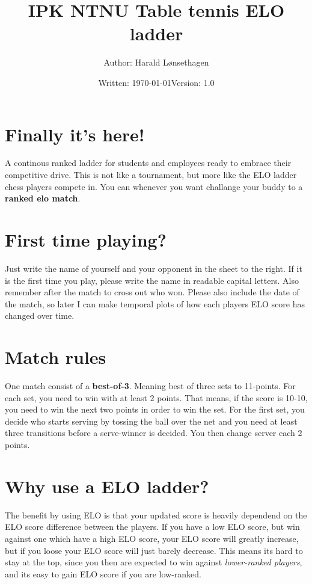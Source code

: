 \documentclass[11pt]{article}
\newcommand\tab[1][1cm]{\hspace*{#1}}
\begin{document}
\title{\textbf{IPK NTNU Table tennis ELO ladder}}
\author{Author: Harald Lønsethagen}
\date{Written: \today\tab Version: 1.0}

\maketitle
 

\makeatletter

\section{Finally it's here!}
A continous ranked ladder for students and employees ready to embrace their competitive drive. This is not like a tournament, but more like the ELO ladder chess players compete in. You can whenever you want challange your buddy to a \textbf{ranked elo match}. 
\section{First time playing?}
Just write the name of yourself and your opponent in the sheet to the right. If it is the first time you play, please write the name in readable capital letters. Also remember after the match to cross out who won. Please also include the date of the match, so later I can make temporal plots of how each players ELO score has changed over time.
\section{Match rules}
One match consist of a \textbf{best-of-3}. Meaning best of three sets to 11-points.
For each set, you need to win with at least 2 points. That means, if the score is 10-10, you need to win the next two points in order to win the set. For the first set, you decide who starts serving by tossing the ball over the net and you need at least three transitions before a serve-winner is decided. You then change server each 2 points.
\section{Why use a ELO ladder?}
The benefit by using ELO is that your updated score is heavily dependend on the ELO score difference between the players. If you have a low ELO score, but win against one which have a high ELO score, your ELO score will greatly increase, but if you loose your ELO score will just barely decrease. This means its hard to stay at the top, since you then are expected to win against \textit{lower-ranked players}, and its easy to gain ELO score if you are low-ranked.\\
\end{document}
